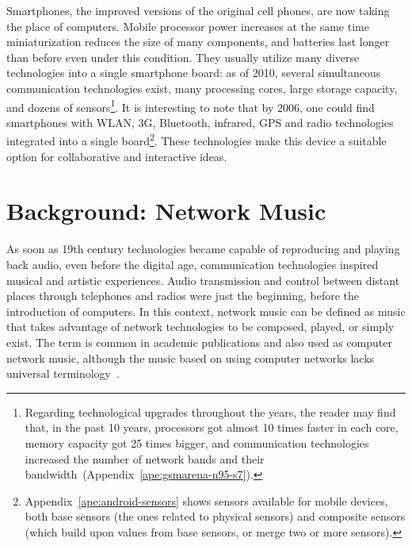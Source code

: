 Smartphones, the improved versions of the original cell phones, are now taking the place of computers.
Mobile processor power increases at the same time miniaturization reduces the size of many components, and batteries last longer than before even under this condition.
They usually utilize many diverse technologies into a single smartphone board: as of 2010, several simultaneous communication technologies exist, many processing cores, large storage capacity, and dozens of sensors\footnote{
	Regarding technological upgrades throughout the years, the reader may find that, in the past 10 years, processors got almost 10 times faster in each core, memory capacity got 25 times bigger, and communication technologies increased the number of network bands and their bandwidth~(Appendix~\ref{ape:gsmarena-n95-s7}).}.
It is interesting to note that by 2006, one could find smartphones with WLAN, 3G, Bluetooth, infrared, GPS and radio technologies integrated into a single board\footnote{
	Appendix~\ref{ape:android-sensors} shows sensors available for mobile devices, both base sensors (the ones related to physical sensors) and composite sensors (which build upon values from base sensors, or merge two or more sensors).}.
These technologies make this device a suitable option for collaborative and interactive ideas.

\section{Background: Network Music}
\label{sec:networkmusic}

As soon as 19th century technologies became capable of reproducing and playing back audio, even before the digital age, communication technologies inspired musical and artistic experiences.
Audio transmission and control between distant places through telephones and radios were just the beginning, before the introduction of computers.
In this context, network music can be defined as music that takes advantage of network technologies to be composed, played, or simply exist.
The term is common in academic publications and also used as computer network music, although the music based on using computer networks lacks universal terminology~\citep{Akkermann2014computer}.

